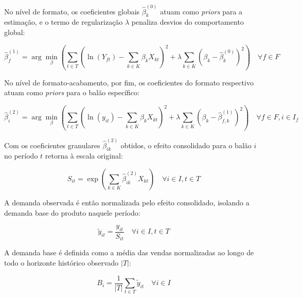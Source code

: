 \documentclass[fleqn,12pt,a4paper]{article}
\begin{document}
No nível de formato, os coeficientes globais $\hat{\beta}^{(0)}_k$ atuam como \textit{priors} para a estimação, e o termo de regularização $\lambda$ penaliza desvios do comportamento global:
\begin{ceqn}
\begin{equation}
\hat{\beta}^{(1)}_{f} = \arg\min_{\beta} \left( \sum_{t \in T} \left( \ln(Y_{ft}) - \sum_{k \in K} \beta_{k} X_{kt} \right)^2 + \lambda \sum_{k \in K} \left( \beta_{k} - \hat{\beta}^{(0)}_k \right)^2 \right) \quad \forall f \in F
\label{eq:demanda_nivel1}
\end{equation}
\end{ceqn}

No nível de formato-acabamento, por fim, os coeficientes do formato respectivo atuam como \textit{priors} para o balão específico:
\begin{ceqn}
\begin{equation}
\hat{\beta}^{(2)}_{i} = \arg\min_{\beta} \left( \sum_{t \in T} \left( \ln(y_{it}) - \sum_{k \in K} \beta_{k} X_{kt} \right)^2 + \lambda \sum_{k \in K} \left( \beta_{k} - \hat{\beta}^{(1)}_{f,k} \right)^2 \right) \quad \forall f \in F, i \in I_f
\label{eq:demanda_nivel2}
\end{equation}
\end{ceqn}

Com os coeficientes granulares $\hat{\beta}^{(2)}_{ik}$ obtidos, o efeito consolidado para o balão $i$ no período $t$ retorna à escala original:
\begin{ceqn}
\begin{equation}
S_{it} = \exp \left( \sum_{k \in K} \hat{\beta}^{(2)}_{ik} X_{kt} \right) \quad \forall i \in I, t \in T
\label{eq:efeito_consolidado}
\end{equation}
\end{ceqn}

A demanda observada é então normalizada pelo efeito consolidado, isolando a demanda base do produto naquele período:
\begin{ceqn}
\begin{equation}
\tilde{y}_{it} = \frac{y_{it}}{S_{it}} \quad \forall i \in I, t \in T
\label{eq:demanda_normalizada}
\end{equation}
\end{ceqn}

A demanda base é definida como a média das vendas normalizadas ao longo de todo o horizonte histórico observado $|T|$:
\begin{ceqn}
\begin{equation}
B_{i} = \frac{1}{|T|} \sum_{t \in T} \tilde{y}_{it} \quad \forall i \in I
\label{eq:demanda_base}
\end{equation}
\end{ceqn}
\end{document}
